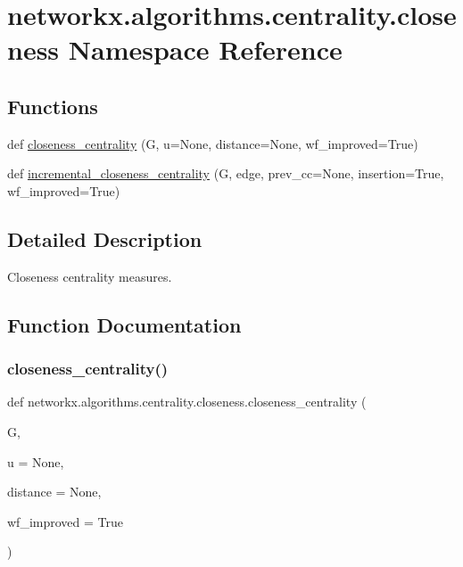 \hypertarget{namespacenetworkx_1_1algorithms_1_1centrality_1_1closeness}{}\section{networkx.\+algorithms.\+centrality.\+closeness Namespace Reference}
\label{namespacenetworkx_1_1algorithms_1_1centrality_1_1closeness}
\subsection*{Functions}
\begin{DoxyCompactItemize}
\item 
def \hyperlink{namespacenetworkx_1_1algorithms_1_1centrality_1_1closeness_a67a23d82c67f6bccea696620781cbee4}{closeness\+\_\+centrality} (G, u=None, distance=None, wf\+\_\+improved=True)
\item 
def \hyperlink{namespacenetworkx_1_1algorithms_1_1centrality_1_1closeness_a1c77443fdb449686cfc2c95b1db242ec}{incremental\+\_\+closeness\+\_\+centrality} (G, edge, prev\+\_\+cc=None, insertion=True, wf\+\_\+improved=True)
\end{DoxyCompactItemize}


\subsection{Detailed Description}
\begin{DoxyVerb}Closeness centrality measures.
\end{DoxyVerb}
 

\subsection{Function Documentation}
\mbox{\label{namespacenetworkx_1_1algorithms_1_1centrality_1_1closeness_a67a23d82c67f6bccea696620781cbee4}} 
\subsubsection{\texorpdfstring{closeness\+\_\+centrality()}{closeness\_centrality()}}
{\footnotesize\ttfamily def networkx.\+algorithms.\+centrality.\+closeness.\+closeness\+\_\+centrality (\begin{DoxyParamCaption}\item[{}]{G,  }\item[{}]{u = {\ttfamily None},  }\item[{}]{distance = {\ttfamily None},  }\item[{}]{wf\+\_\+improved = {\ttfamily True} }\end{DoxyParamCaption})}

